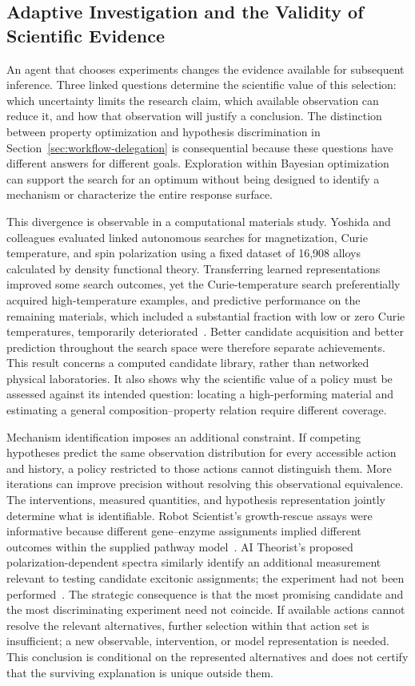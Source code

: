 \subsection{Adaptive Investigation and the Validity of Scientific Evidence}
\label{sec:adaptive-evidence}

An agent that chooses experiments changes the evidence available for subsequent inference. Three linked questions determine the scientific value of this selection: which uncertainty limits the research claim, which available observation can reduce it, and how that observation will justify a conclusion. The distinction between property optimization and hypothesis discrimination in Section~\ref{sec:workflow-delegation} is consequential because these questions have different answers for different goals. Exploration within Bayesian optimization can support the search for an optimum without being designed to identify a mechanism or characterize the entire response surface.

This divergence is observable in a computational materials study. Yoshida and colleagues evaluated linked autonomous searches for magnetization, Curie temperature, and spin polarization using a fixed dataset of 16,908 alloys calculated by density functional theory. Transferring learned representations improved some search outcomes, yet the Curie-temperature search preferentially acquired high-temperature examples, and predictive performance on the remaining materials, which included a substantial fraction with low or zero Curie temperatures, temporarily deteriorated~\cite{asd0513}. Better candidate acquisition and better prediction throughout the search space were therefore separate achievements. This result concerns a computed candidate library, rather than networked physical laboratories. It also shows why the scientific value of a policy must be assessed against its intended question: locating a high-performing material and estimating a general composition--property relation require different coverage.

Mechanism identification imposes an additional constraint. If competing hypotheses predict the same observation distribution for every accessible action and history, a policy restricted to those actions cannot distinguish them. More iterations can improve precision without resolving this observational equivalence. The interventions, measured quantities, and hypothesis representation jointly determine what is identifiable. Robot Scientist's growth-rescue assays were informative because different gene--enzyme assignments implied different outcomes within the supplied pathway model~\cite{king2004}. AI Theorist's proposed polarization-dependent spectra similarly identify an additional measurement relevant to testing candidate excitonic assignments; the experiment had not been performed~\cite{asd1081}. The strategic consequence is that the most promising candidate and the most discriminating experiment need not coincide. If available actions cannot resolve the relevant alternatives, further selection within that action set is insufficient; a new observable, intervention, or model representation is needed. This conclusion is conditional on the represented alternatives and does not certify that the surviving explanation is unique outside them.

